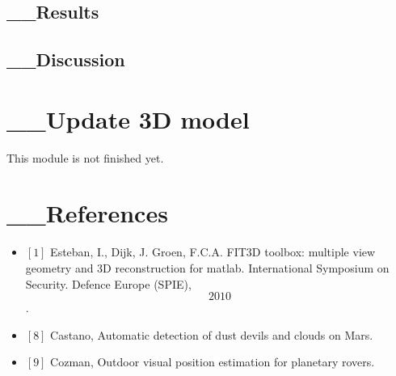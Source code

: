\documentclass[10pt]{article}
\begin{document}
\subsection{__Results}


\subsection{__Discussion}

\section{__Update 3D model}
This module is not finished yet.


\section{__References}
\begin{itemize}
\item $[1]$ 
Esteban, I., Dijk, J. Groen, F.C.A. FIT3D toolbox: multiple view geometry and
3D reconstruction for matlab. International Symposium on Security. Defence
Europe (SPIE), \[2010\].
\item $[8]$ Castano, Automatic detection of dust devils and clouds on Mars.
\item $[9]$ Cozman, Outdoor visual position estimation for planetary rovers.
\end{itemize}



%





\end{document}
